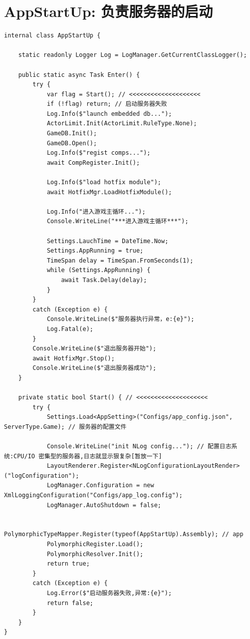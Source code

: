 \documentclass[9pt, b5paper]{article}
\begin{document}
\section{AppStartUp: 负责服务器的启动}
\label{sec:orgfae08eb}
\begin{verbatim}
internal class AppStartUp {

    static readonly Logger Log = LogManager.GetCurrentClassLogger();

    public static async Task Enter() {
        try {
            var flag = Start(); // <<<<<<<<<<<<<<<<<<<< 
            if (!flag) return; // 启动服务器失败
            Log.Info($"launch embedded db...");
            ActorLimit.Init(ActorLimit.RuleType.None);
            GameDB.Init();
            GameDB.Open();
            Log.Info($"regist comps...");
            await CompRegister.Init();

            Log.Info($"load hotfix module");
            await HotfixMgr.LoadHotfixModule();

            Log.Info("进入游戏主循环...");
            Console.WriteLine("***进入游戏主循环***");

            Settings.LauchTime = DateTime.Now;
            Settings.AppRunning = true;
            TimeSpan delay = TimeSpan.FromSeconds(1);
            while (Settings.AppRunning) {
                await Task.Delay(delay);
            }
        }
        catch (Exception e) {
            Console.WriteLine($"服务器执行异常，e:{e}");
            Log.Fatal(e);
        }
        Console.WriteLine($"退出服务器开始");
        await HotfixMgr.Stop();
        Console.WriteLine($"退出服务器成功");
    }

    private static bool Start() { // <<<<<<<<<<<<<<<<<<<< 
        try {
            Settings.Load<AppSetting>("Configs/app_config.json", ServerType.Game); // 服务器的配置文件 

            Console.WriteLine("init NLog config..."); // 配置日志系统:CPU/IO 密集型的服务器,日志就显示狠复杂[暂放一下]
            LayoutRenderer.Register<NLogConfigurationLayoutRender>("logConfiguration");
            LogManager.Configuration = new XmlLoggingConfiguration("Configs/app_log.config");
            LogManager.AutoShutdown = false;

            PolymorphicTypeMapper.Register(typeof(AppStartUp).Assembly); // app
            PolymorphicRegister.Load();
            PolymorphicResolver.Init();
            return true;
        }
        catch (Exception e) {
            Log.Error($"启动服务器失败,异常:{e}");
            return false;
        }
    }
}
\end{verbatim}
\end{document}
